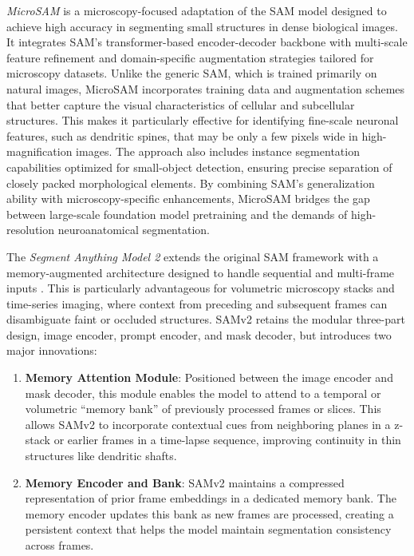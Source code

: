 \textit{MicroSAM} \cite{Archit_2025} is a microscopy-focused adaptation of the \gls{SAM} model designed to achieve high accuracy in segmenting small structures in dense biological images. It integrates \gls{SAM}’s transformer-based encoder-decoder backbone with multi-scale feature refinement and domain-specific augmentation strategies tailored for microscopy datasets. Unlike the generic \gls{SAM}, which is trained primarily on natural images, MicroSAM incorporates training data and augmentation schemes that better capture the visual characteristics of cellular and subcellular structures. This makes it particularly effective for identifying fine-scale neuronal features, such as dendritic spines, that may be only a few pixels wide in high-magnification images. The approach also includes instance segmentation capabilities optimized for small-object detection, ensuring precise separation of closely packed morphological elements. By combining SAM’s generalization ability with microscopy-specific enhancements, Micro\gls{SAM} bridges the gap between large-scale foundation model pretraining and the demands of high-resolution neuroanatomical segmentation.

The \textit{Segment Anything Model 2} extends the original \gls{SAM} framework with a memory-augmented architecture designed to handle sequential and multi-frame inputs \cite{Ravi_2024}. This is particularly advantageous for volumetric microscopy stacks and time-series imaging, where context from preceding and subsequent frames can disambiguate faint or occluded structures. \gls{SAMv2} retains the modular three-part design, image encoder, prompt encoder, and mask decoder, but introduces two major innovations:

\begin{enumerate}
    \item \textbf{Memory Attention Module}: Positioned between the image encoder and mask decoder, this module enables the model to attend to a temporal or volumetric ``memory bank'' of previously processed frames or slices. This allows \gls{SAMv2} to incorporate contextual cues from neighboring planes in a z-stack or earlier frames in a time-lapse sequence, improving continuity in thin structures like dendritic shafts.

    \item \textbf{Memory Encoder and Bank}:  \gls{SAMv2} maintains a compressed representation of prior frame embeddings in a dedicated memory bank. The memory encoder updates this bank as new frames are processed, creating a persistent context that helps the model maintain segmentation consistency across frames.
\end{enumerate}

